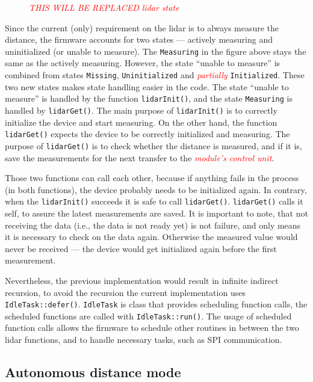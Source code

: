 \documentclass[
  digital,     %
  oneside,     %
  nosansbold,  %
  nocolorbold, %
  lof,         %
  lot,         %
]{fithesis4}
\newcommand{\TODO}[1]{\textcolor{red}{\textit{#1}}}
\begin{document}
{{{\begin{figure}[ht]
    
    \caption[Diagram of \acrshort{lidar}'s state]{\TODO{THIS WILL BE REPLACED lidar state}}
    \label{fig:lidar-state}
\end{figure}

Since the current (only) requirement on the \acrshort{lidar} is to always measure the distance, the firmware accounts for two states --- actively measuring and uninitialized (or unable to measure). The \verb|Measuring| in the figure above stays the same as the actively measuring. However, the state ``unable to measure'' is combined from states \verb|Missing|, \verb|Uninitialized| and \TODO{partially} \verb|Initialized|. These two new states makes state handling easier in the code. The state ``unable to measure'' is handled by the function \lstinline|lidarInit()|, and the state \verb|Measuring| is handled by \lstinline|lidarGet()|. The main purpose of \lstinline|lidarInit()| is to correctly initialize the device and start measuring. On the other hand, the function \lstinline|lidarGet()| expects the device to be correctly initialized and measuring. The purpose of \lstinline|lidarGet()| is to check whether the distance is measured, and if it is, save the measurements for the next transfer to the \TODO{module's control unit}.

Those two functions can call each other, because if anything fails in the process (in both functions), the device probably needs to be initialized again. In contrary, when the \lstinline|lidarInit()| succeeds it is safe to call \lstinline|lidarGet()|. \lstinline|lidarGet()| calls it self, to assure the latest measurements are saved. It is important to note, that not receiving the data (i.e., the data is not ready yet) is not failure, and only means it is necessary to check on the data again. Otherwise the measured value would never be received --- the device would get initialized again before the first measurement.

Nevertheless, the previous implementation would result in infinite indirect recursion, to avoid the recursion the current implementation uses \lstinline|IdleTask::defer()|. \lstinline|IdleTask| is class that provides scheduling function calls, the scheduled functions are called with \lstinline[breaklines=false]|IdleTask::run()|. The usage of scheduled function calls allows the firmware to schedule other routines in between the two lidar functions, and to handle necessary tasks, such as SPI communication.

\subsection{ Autonomous distance mode }


}}}
\end{document}
